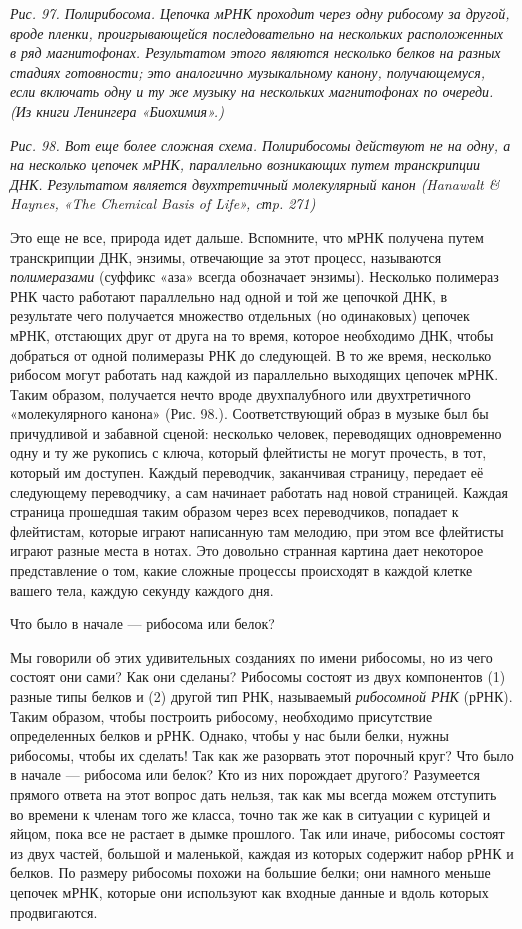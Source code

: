 \documentclass[../main.tex]{subfiles}
\begin{document}
\emph{Рис. 97. Полирибосома. Цепочка мРНК проходит через одну рибосому за другой, вроде пленки, проигрывающейся последовательно на нескольких расположенных в ряд магнитофонах. Результатом этого являются несколько белков на разных стадиях готовности; это аналогично музыкальному канону, получающемуся, если включать одну и ту же музыку на нескольких магнитофонах по очереди. (Из книги Ленингера «Биохимия».)}

\emph{Рис. 98. Вот еще более сложная схема. Полирибосомы действуют не на одну, а на несколько цепочек мРНК, параллельно возникающих путем транскрипции ДНК\@. Результатом является двухтретичный молекулярный канон (Hanawalt \& Haynes, «The Chemical Basis of Life», cтp. 271)}

Это еще не все, природа идет дальше. Вспомните, что мРНК получена путем транскрипции ДНК, энзимы, отвечающие за этот процесс, называются \emph{полимеразами} (суффикс «аза» всегда обозначает энзимы). Несколько полимераз РНК часто работают параллельно над одной и той же цепочкой ДНК, в результате чего получается множество отдельных (но одинаковых) цепочек мРНК, отстающих друг от друга на то время, которое необходимо ДНК, чтобы добраться от одной полимеразы РНК до следующей. В то же время, несколько рибосом могут работать над каждой из параллельно выходящих цепочек мРНК\@. Таким образом, получается нечто вроде двухпалубного или двухтретичного «молекулярного канона» (Рис. 98.). Соответствующий образ в музыке был бы причудливой и забавной сценой: несколько человек, переводящих одновременно одну и ту же рукопись с ключа, который флейтисты не могут прочесть, в тот, который им доступен. Каждый переводчик, заканчивая страницу, передает её следующему переводчику, а сам начинает работать над новой страницей. Каждая страница прошедшая таким образом через всех переводчиков, попадает к флейтистам, которые играют написанную там мелодию, при этом все флейтисты играют разные места в нотах. Это довольно странная картина дает некоторое представление о том, какие сложные процессы происходят в каждой клетке вашего тела, каждую секунду каждого дня.

Что было в начале --- рибосома или белок?

Мы говорили об этих удивительных созданиях по имени рибосомы, но из чего состоят они сами? Как они сделаны? Рибосомы состоят из двух компонентов (1) разные типы белков и (2) другой тип РНК, называемый \emph{рибосомной РНК} (рРНК). Таким образом, чтобы построить рибосому, необходимо присутствие определенных белков и рРНК\@. Однако, чтобы у нас были белки, нужны рибосомы, чтобы их сделать! Так как же разорвать этот порочный круг? Что было в начале --- рибосома или белок? Кто из них порождает другого? Разумеется прямого ответа на этот вопрос дать нельзя, так как мы всегда можем отступить во времени к членам того же класса, точно так же как в ситуации с курицей и яйцом, пока все не растает в дымке прошлого. Так или иначе, рибосомы состоят из двух частей, большой и маленькой, каждая из которых содержит набор рРНК и белков. По размеру рибосомы похожи на большие белки; они намного меньше цепочек мРНК, которые они используют как входные данные и вдоль которых продвигаются.
\end{document}
